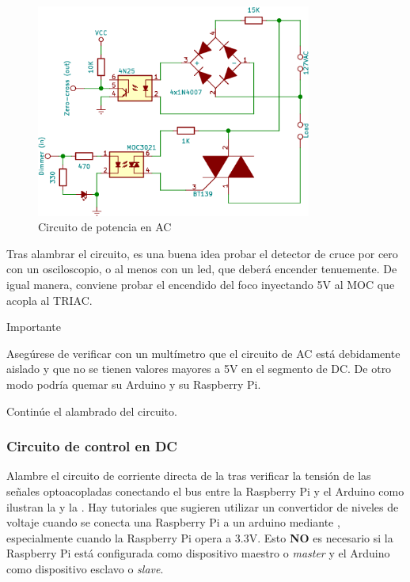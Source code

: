 \begin{figure}[H]
	\centering
	\includegraphics[width=0.5\columnwidth,height=7cm,keepaspectratio]{img/circuit-ac.png}
	\caption{Circuito de potencia en AC}%
	\label{fig:circuit-ac}
\end{figure}

Tras alambrar el circuito, es una buena idea probar el detector de cruce por cero con un osciloscopio, o al menos con un led, que deberá encender tenuemente.
De igual manera, conviene probar el encendido del foco inyectando 5V al MOC que acopla al TRIAC.

\medskip
\begin{importantbox}{\large Importante}
	\begin{center}
		Asegúrese de verificar con un multímetro que el circuito de AC está debidamente aislado y que no se tienen valores mayores a 5V en el segmento de DC.
		De otro modo podría quemar su Arduino y su Raspberry Pi.
	\end{center}
\end{importantbox}

Continúe el alambrado del circuito.

\subsubsection{Circuito de control en DC}%
Alambre el circuito de corriente directa de la  tras verificar la tensión de las señales optoacopladas conectando el bus \IIC entre la Raspberry Pi y el Arduino como ilustran la  y la .
Hay tutoriales que sugieren utilizar un convertidor de niveles de voltaje cuando se conecta una Raspberry Pi a un arduino mediante \IIC, especialmente cuando la Raspberry Pi opera a 3.3V.
Esto \textbf{NO} es necesario si la Raspberry Pi está configurada como dispositivo maestro o \emph{master} y el Arduino como dispositivo esclavo o \emph{slave}.

